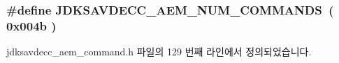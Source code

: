 \subsubsection[{\texorpdfstring{J\+D\+K\+S\+A\+V\+D\+E\+C\+C\+\_\+\+A\+E\+M\+\_\+\+N\+U\+M\+\_\+\+C\+O\+M\+M\+A\+N\+DS}{JDKSAVDECC_AEM_NUM_COMMANDS}}]{\setlength{\rightskip}{0pt plus 5cm}\#define J\+D\+K\+S\+A\+V\+D\+E\+C\+C\+\_\+\+A\+E\+M\+\_\+\+N\+U\+M\+\_\+\+C\+O\+M\+M\+A\+N\+DS~( 0x004b )}\hypertarget{group__command_ga2a4cac63d94c9b2cd9789395545d0148}{}\label{group__command_ga2a4cac63d94c9b2cd9789395545d0148}


jdksavdecc\+\_\+aem\+\_\+command.\+h 파일의 129 번째 라인에서 정의되었습니다.

